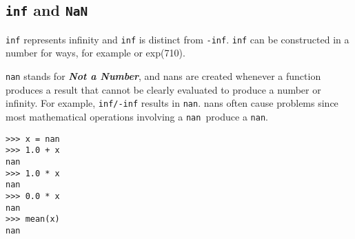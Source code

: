 \documentclass[Pydata.tex]{subfiles}
\begin{document}
 
\subsection{ \texttt{inf} and \texttt{NaN}}
\texttt{inf} represents infinity and \texttt{inf} is distinct from \texttt{-inf}.
\texttt{inf} can be constructed in a number for ways, for
example or exp(710). 

\texttt{nan} stands for \textbf{\textit{Not a Number}}, and nans are created whenever a function produces
a result that cannot be clearly evaluated to produce a number or infinity. For example, \texttt{inf/-inf} results in
\texttt{nan}. nans often cause problems since most mathematical operations involving a \texttt{nan }produce a \texttt{nan}.
\begin{framed}
\begin{verbatim}
>>> x = nan
>>> 1.0 + x
nan
>>> 1.0 * x
nan
>>> 0.0 * x
nan
>>> mean(x)
nan
\end{verbatim}
\end{framed}
\end{document}

